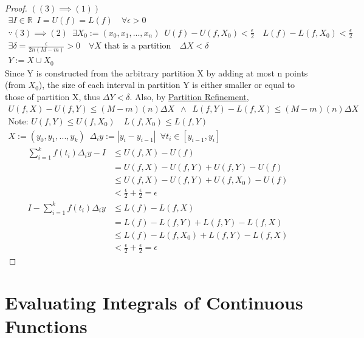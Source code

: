 \documentclass[11pt, oneside]{book}
\theoremstyle{break}
\newtheorem*{proof}{Proof}
\newcommand{\bb}[1]{\mathbb{#1}}			%
\begin{document}
\begin{proof}
	$((3) \implies (1))$
	\begin{gather*}
		\exists I \in \bb{R} \enspace I = U(f) = L(f) \quad \forall \epsilon > 0 \\
		\because (3) \implies (2) \enspace \exists X_0 := (x_0, x_1, ..., x_n) \enspace U(f) - U(f, X_0) < \frac{\epsilon}{2} \quad L(f) - L(f, X_0) < \frac{\epsilon}{2} \\
		\exists \delta = \frac{\epsilon}{2n(M - m)} > 0 \quad \forall X \text{ that is a partition} \quad \Delta X < \delta \\
		Y := X \cup X_0
	\end{gather*}
	Since Y is constructed from the arbitrary partition X by adding at most n points (from $X_0$), the size of each interval in partition Y is either smaller or equal to those of partition X, thus $\Delta Y < \delta$. Also, by \hyperref[partition_refinement]{Partition Refinement},
	\begin{gather*}
		U(f, X) - U(f, Y) \leq (M - m)(n) \Delta X \enspace \land \enspace L(f, Y) - L(f, X) \leq (M - m)(n) \Delta X \\
		\text{Note: } U(f, Y) \leq U(f, X_0) \quad L(f, X_0) \leq L(f, Y) \\
		X := (y_0, y_1, ..., y_k) \enspace \Delta_i y := |y_i - y_{i-1} | \enspace \forall t_i \in [y_{i-1}, y_i]
	\end{gather*}
	\begin{align*}
		\sum_{i=1}^{k} f(t_i) \Delta_i y - I &\leq U(f, X) - U(f) \\
											 &= U(f, X) - U(f, Y) + U(f, Y) - U(f) \\
											 &\leq U(f, X) - U(f, Y) + U(f, X_0) - U(f) \\
											 &< \frac{\epsilon}{2} + \frac{\epsilon}{2} = \epsilon \\
		I - \sum_{i=1}^{k} f(t_i) \Delta_i y &\leq L(f) - L(f, X) \\
											 &= L(f) - L(f, Y) + L(f, Y) - L(f, X) \\
											 &\leq L(f) - L(f, X_0) + L(f, Y) - L(f, X) \\
											 &< \frac{\epsilon}{2} + \frac{\epsilon}{2} = \epsilon
	\end{align*}
\end{proof}


\section{Evaluating Integrals of Continuous Functions}
\end{document}
